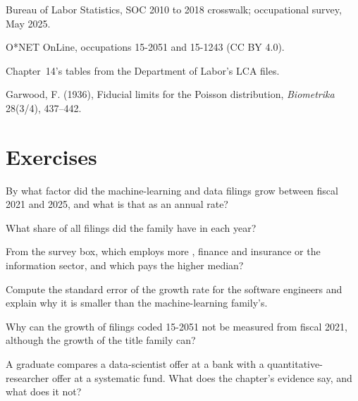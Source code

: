 \begin{omsources}
\item Bureau of Labor Statistics, SOC 2010 to 2018 crosswalk; occupational survey, May 2025.
\item O*NET OnLine, occupations 15-2051 and 15-1243 (CC BY 4.0).
\item Chapter~14's tables from the Department of Labor's LCA files.
\item Garwood, F. (1936), Fiducial limits for the Poisson distribution, \emph{Biometrika} 28(3/4), 437--442.
\end{omsources}

\section{Exercises}

\begin{exercise}[$\star$]\label{exo:in:machine-learning-and-data-engineer:1}
By what factor did the machine-learning and data filings grow between fiscal 2021 and 2025, and what is that as an annual
rate?
\end{exercise}

\begin{exercise}[$\star$]\label{exo:in:machine-learning-and-data-engineer:2}
What share of all filings did the family have in each year?
\end{exercise}

\begin{exercise}[$\star$]\label{exo:in:machine-learning-and-data-engineer:3}
From the survey box, which employs more , finance and insurance or the information sector, and which pays
the higher median?
\end{exercise}

\begin{exercise}[$\star\star$]\label{exo:in:machine-learning-and-data-engineer:4}
Compute the standard error of the growth rate for the software engineers and explain why it is smaller than the
machine-learning family's.
\end{exercise}

\begin{exercise}[$\star\star$]\label{exo:in:machine-learning-and-data-engineer:5}
Why can the growth of filings coded 15-2051 not be measured from fiscal 2021, although the growth of the title family can?
\end{exercise}

\begin{exercise}[$\star\star$]\label{exo:in:machine-learning-and-data-engineer:6}
A graduate compares a data-scientist offer at a bank with a quantitative-researcher offer at a systematic fund. What does
the chapter's evidence say, and what does it not?
\end{exercise}

